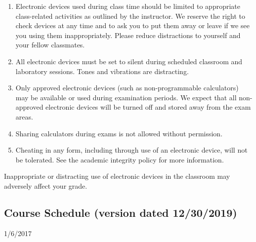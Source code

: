 \documentclass{tufte-handout}
\begin{document}
\begin{fullwidth}
\begin{enumerate}
\item Electronic devices used during class time should be limited to appropriate class-related activities as outlined by the instructor. We reserve the right to check devices at any time and to ask you to put them away or leave if we see you using them inappropriately. Please reduce distractions to yourself and your fellow classmates.
\item All electronic devices must be set to silent during scheduled classroom and laboratory sessions. Tones and vibrations are distracting.
\item Only approved electronic devices (such as non-programmable calculators) may be available or used during examination periods. We expect that all non-approved electronic devices will be turned off and stored away from the exam areas.
\item Sharing calculators during exams is not allowed without permission. 
\item Cheating in any form, including through use of an electronic device, will not be tolerated. See the academic integrity policy for more information.
\end{enumerate}

Inappropriate or distracting use of electronic devices in the classroom may adversely affect your  grade. 








\newpage
\subsection{Course Schedule (version dated 12/30/2019)}
%


  \setlength{\calwidth}{6.5in}
  \setlength{\calboxdepth}{0.3in}
  \begin{calendar}{1/6/20}{17}

 \skipday%
  \calday[Tuesday]{\classday} %
 \skipday%
  \calday[Thursday]{\classday} %
 \skipday%
    \skipday
    \skipday %








\end{calendar}
\end{fullwidth}
\end{document}
